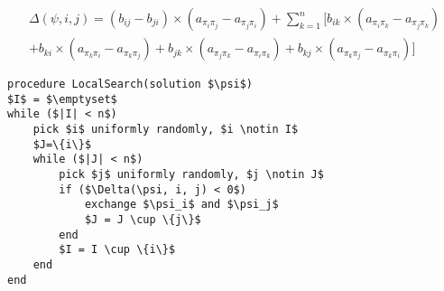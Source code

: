 \documentclass[12pt]{article}
\begin{document}
\begin{align*}
\Delta(\psi,i,j) = (b_{ij} - b_{ji}) \times (a_{\pi_i\pi_j} - a_{\pi_j\pi_i}) + \sum_{k = 1}^{n} [b_{ik} \times (a_{\pi_i\pi_k} - a_{\pi_j\pi_k}) \\+ b_{ki} \times (a_{\pi_k\pi_i} - a_{\pi_k\pi_j}) 
 + b_{jk} \times (a_{\pi_j\pi_k} - a_{\pi_i\pi_k}) + b_{kj} \times (a_{\pi_k\pi_j} - a_{\pi_k\pi_i})]
\label{eq:delta}
\end{align*}

\begin{minipage}[c]{0.95\textwidth}
\begin{lstlisting}[caption={Local Search pseudo-code}, label={lst:local-search},mathescape]
procedure LocalSearch(solution $\psi$)
$I$ = $\emptyset$
while ($|I| < n$)
	pick $i$ uniformly randomly, $i \notin I$
	$J=\{i\}$
	while ($|J| < n$)
		pick $j$ uniformly randomly, $j \notin J$
		if ($\Delta(\psi, i, j) < 0$)
			exchange $\psi_i$ and $\psi_j$
			$J = J \cup \{j\}$
		end
		$I = I \cup \{i\}$
	end
end
\end{lstlisting}
\end{minipage}



\end{document}
